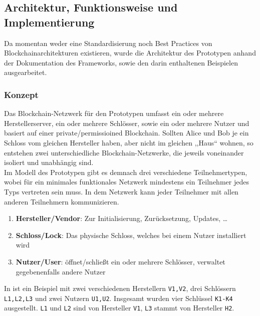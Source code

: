 \subsection{Architektur, Funktionsweise und Implementierung}
\label{sec:prototype_arch} 
    Da momentan weder eine Standardisierung noch Best Practices von Blockchainarchitekturen existieren, wurde die Architektur des Prototypen anhand der Dokumentation des Frameworks\cite{ComposerDocs}, sowie den darin enthaltenen Beispielen ausgearbeitet. 
    
    \subsubsection{Konzept}
    \label{sec:prototype_arch_concept} 
        Das Blockchain-Netzwerk für den Prototypen umfasst ein oder mehrere Herstellerserver, ein oder mehrere Schlösser, sowie ein oder mehrere Nutzer und basiert auf einer private/permissioined Blockchain. 
        Sollten Alice und Bob je ein Schloss vom gleichen Hersteller haben, aber nicht im gleichen ,,Haus`` wohnen, so entstehen zwei unterschiedliche Blockchain-Netzwerke, die jeweils voneinander isoliert und unabhängig sind.
        \medskip\\
        Im Modell des Prototypen gibt es demnach drei verschiedene Teilnehmertypen, wobei für ein minimales funktionales Netzwerk mindestens ein Teilnehmer jedes Typs vertreten sein muss. 
        In dem Netzwerk kann jeder Teilnehmer mit allen anderen Teilnehmern kommunizieren.
        \begin{enumerate}[noitemsep]
            \item \textbf{Hersteller/Vendor}: Zur Initialisierung, Zurücksetzung, Updates, \dots
            \item \textbf{Schloss/Lock}: Das physische Schloss, welches bei einem Nutzer installiert wird
            \item \textbf{Nutzer/User}: öffnet/schließt ein oder mehrere Schlösser, verwaltet gegebenenfalls andere Nutzer
        \end{enumerate}
        \newpage
        \noindent In  ist ein Beispiel mit zwei verschiedenen Herstellern \colorbox{light-gray}{\lstinline{V1,V2}}, drei Schlössern \colorbox{light-gray}{\lstinline{L1,L2,L3}} und zwei Nutzern \colorbox{light-gray}{\lstinline{U1,U2}}. 
        Insgesamt wurden vier Schlüssel \colorbox{light-gray}{\lstinline{K1-K4}} ausgestellt.
        \colorbox{light-gray}{\lstinline{L1}} und \colorbox{light-gray}{\lstinline{L2}} sind von Hersteller \colorbox{light-gray}{\lstinline{V1}}, \colorbox{light-gray}{\lstinline{L3}} stammt von Hersteller \colorbox{light-gray}{\lstinline{H2}}. 
